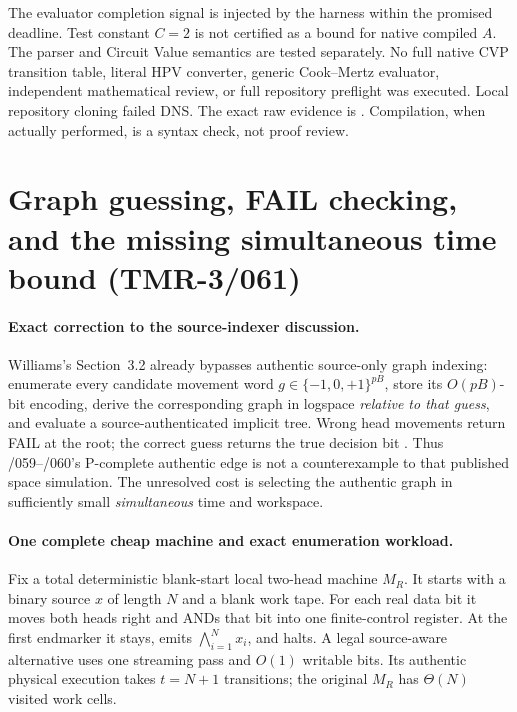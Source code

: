 \documentclass[11pt]{article}
\begin{document}
The evaluator completion signal is injected by the harness within the
promised deadline. Test constant $C=2$ is not certified as a bound for
native compiled $A$. The parser and Circuit Value semantics are tested
separately. No full native CVP transition table, literal HPV converter,
generic Cook--Mertz evaluator, independent mathematical review, or full
repository preflight was executed. Local repository cloning failed DNS.
The exact raw evidence is
.
Compilation, when actually performed, is a syntax check, not proof review.


\section{Graph guessing, FAIL checking, and the missing simultaneous time bound (TMR-3/061)}
\paragraph{Exact correction to the source-indexer discussion.}
Williams's Section~3.2 already bypasses authentic source-only graph
indexing: enumerate every candidate movement word
$g\in\{-1,0,+1\}^{pB}$, store its $O(pB)$-bit encoding, derive the
corresponding graph in logspace \emph{relative to that guess}, and
evaluate a source-authenticated implicit tree. Wrong head movements
return FAIL at the root; the correct guess returns the true decision
bit \cite{Williams2025}. Thus /059--/060's P-complete authentic
edge is not a counterexample to that published space simulation.
The unresolved cost is selecting the authentic graph in sufficiently
small \emph{simultaneous} time and workspace.

\paragraph{One complete cheap machine and exact enumeration workload.}
Fix a total deterministic blank-start local two-head machine $M_R$.
It starts with a binary source $x$ of length $N$ and a blank work tape.
For each real data bit it moves both heads right and ANDs that bit into
one finite-control register. At the first endmarker it stays, emits
$\bigwedge_{i=1}^{N}x_i$, and halts. A legal source-aware alternative
uses one streaming pass and $O(1)$ writable bits. Its authentic physical
execution takes $t=N+1$ transitions; the original $M_R$ has
$\Theta(N)$ visited work cells.
\end{document}
